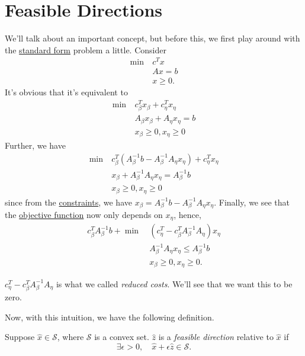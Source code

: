\section{Feasible Directions}
We'll talk about an important concept, but before this, we first play around with the \hyperref[def:standard-form]{standard form} problem a little. Consider
\begin{align*}
	\min~ & c^Tx     \\
	      & Ax = b   \\
	      & x\geq 0.
\end{align*}
It's obvious that it's equivalent to
\begin{align*}
	\min~ & c^{T}_{\beta}x_{\beta} + c^{T}_{\eta}x_{\eta} \\
	      & A_{\beta}x_{\beta} + A_{\eta}x_{\eta} = b     \\
	      & x_{\beta}\geq 0, x_{\eta}\geq 0
\end{align*}
Further, we have
\begin{align*}
	\min~ & c^{T}_{\beta}(A^{-1}_{\beta}b - A^{-1}_{\beta}A_{\eta}x_{\eta} ) + c_{\eta}^{T}x_{\eta} \\
	      & x_{\beta} + A^{-1}_{\beta}A_{\eta}x_{\eta} = A^{-1}_{\beta}b                            \\
	      & x_{\beta}\geq 0, x_{\eta}\geq 0
\end{align*}
since from the \hyperref[def:constraints]{constraints}, we have \(x_{\beta} = A^{-1}_{\beta}b - A^{-1}_{\beta}A_{\eta}x_{\eta}\). Finally, we see that
the \hyperref[def:objective-function]{objective function} now only depends on \(x_{\eta}\), hence,
\begin{align*}
	c^{T}_{\beta}A^{-1}_{\beta}b + \min~ & (c_{\eta}^{T} - c_{\beta}^{T}A^{-1}_{\beta}A_{\eta})x_{\eta} \\
	                                     & A^{-1}_{\beta}A_{\eta}x_{\eta} \leq A^{-1}_{\beta}b          \\
	                                     & x_{\beta}\geq 0, x_{\eta}\geq 0.
\end{align*}

\begin{note}
	\(c_{\eta}^{T} - c_{\beta}^{T}A^{-1}_{\beta}A_{\eta}\) is what we called \emph{reduced costs}. We'll see that we want this to be zero.
\end{note}

Now, with this intuition, we have the following definition.
\begin{definition}
	Suppose \(\hat{x}\in \mathcal{S}\), where \(\mathcal{S}\) is a convex set. \(\hat{z}\) is a \emph{feasible direction} relative to \(\hat{x}\) if
	\[
		\exists \epsilon>0,\quad \hat{x}+\epsilon \hat{z} \in \mathcal{S}.
	\]
\end{definition}

